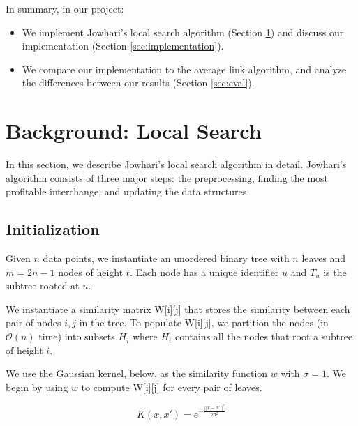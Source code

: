 \documentclass[unnumsec,webpdf,contemporary,large,numbered]{oup-authoring-template}%
\theoremstyle{thmstyleone}%
\theoremstyle{thmstyletwo}%
\theoremstyle{thmstylethree}%
\begin{document}


In summary, in our project:
\begin{itemize}
    \item We implement Jowhari's local search algorithm (Section \ref{sec:background}) and discuss our implementation (Section \ref{sec:implementation}).
    \item We compare our implementation to the average link algorithm, and analyze the differences between our results (Section \ref{sec:eval}).
\end{itemize}

\section{Background: Local Search} \label{sec:background}
In this section, we describe Jowhari's local search algorithm in detail. Jowhari's algorithm consists of three major steps: the preprocessing, finding the most profitable interchange, and updating the data structures.


\subsection{Initialization}
Given $n$ data points, we instantiate an unordered binary tree with $n$ leaves and $m=2n-1$ nodes of height $t$. Each node has a unique identifier $u$ and $T_u$ is the subtree rooted at $u$.

We instantiate a similarity matrix {\sf W[i][j]} that stores the similarity between each pair of nodes $i,j$ in the tree. To populate {\sf W[i][j]}, we partition the nodes (in $\mathcal{O}(n)$ time) into subsets $H_i$ where $H_i$ contains all the nodes that root a subtree of height $i$.

We use the Gaussian kernel, below, as the similarity function $w$ with $\sigma=1$. 
We begin by using $w$ to compute \textsf{W[i][j]} for every pair of leaves.

\[ K(x,x') = e^{-\frac{||x - x'||^2}{2\sigma^2}} \]
\end{document}
